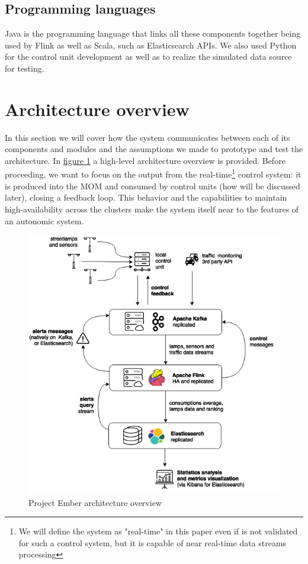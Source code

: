 \subsection{Programming languages}
Java is the programming language that links all these components together being used by Flink as well as Scala, such as Elasticsearch APIs. We also used Python for the control unit development as well as to realize the simulated data source for testing.


\section{Architecture overview}
In this section we will cover how the system communicates between each of its components and modules and the assumptions we made to prototype and test the architecture. In \hyperref[fig:ember_architecture]{figure 1} a high-level architecture overview is provided. Before proceeding, we want to focus on the output from the real-time\footnote{We will define the system as "real-time" in this paper even if is not validated for such a control system, but it is capable of near real-time data streams processing} control system: it is produced into the MOM and consumed by control units (how will be discussed later), closing a feedback loop. This behavior and the capabilities to maintain high-availability across the clusters make the system itself near to the features of an autonomic system.
\begin{figure}[!b]
\begin{center}
	\includegraphics[scale=0.35]{img/ember_architecture}
	\caption{Project Ember architecture overview}
	\label{fig:ember_architecture}
\end{center}
\end{figure}

